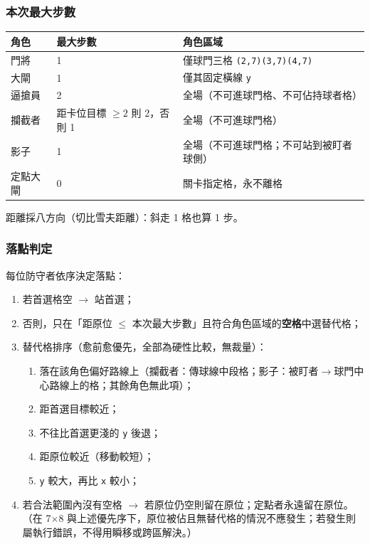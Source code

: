 \documentclass[11pt]{article}
\newcommand{\coord}[1]{\texttt{#1}}
\begin{document}
\subsubsection*{本次最大步數}

\vspace{0.3em}
\begin{tabular}{@{}lll@{}}
\toprule
\textbf{角色} & \textbf{最大步數} & \textbf{角色區域} \\
\midrule
門將 & 1 & 僅球門三格 \coord{(2,7)(3,7)(4,7)} \\
大閘 & 1 & 僅其固定橫線 \coord{y} \\
逼搶員 & 2 & 全場（不可進球門格、不可佔持球者格） \\
攔截者 & 距卡位目標 $\geq 2$ 則 2，否則 1 & 全場（不可進球門格） \\
影子 & 1 & 全場（不可進球門格；不可站到被盯者球側） \\
定點大閘 & 0 & 關卡指定格，永不離格 \\
\bottomrule
\end{tabular}

\vspace{0.4em}
\noindent
距離採八方向（切比雪夫距離）：斜走 1 格也算 1 步。

\subsubsection*{落點判定}

每位防守者依序決定落點：

\begin{enumerate}
  \item 若首選格空 $\rightarrow$ 站首選；
  \item 否則，只在「距原位 $\leq$ 本次最大步數」且符合角色區域的\textbf{空格}中選替代格；
  \item 替代格排序（愈前愈優先，全部為硬性比較，無裁量）：
  \begin{enumerate}
    \item 落在該角色偏好路線上（攔截者：傳球線中段格；影子：被盯者$\rightarrow$球門中心路線上的格；其餘角色無此項）；
    \item 距首選目標較近；
    \item 不往比首選更淺的 \coord{y} 後退；
    \item 距原位較近（移動較短）；
    \item \coord{y} 較大，再比 \coord{x} 較小；
  \end{enumerate}
  \item 若合法範圍內沒有空格 $\rightarrow$ 若原位仍空則留在原位；定點者永遠留在原位。（在 7$\times$8 與上述優先序下，原位被佔且無替代格的情況不應發生；若發生則屬執行錯誤，不得用瞬移或跨區解決。）
\end{enumerate}
\end{document}
